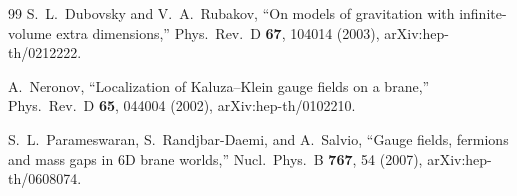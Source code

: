\documentclass[aps,prd,reprint,superscriptaddress,nofootinbib,floatfix]{revtex4-2}
\theoremstyle{definition}
\begin{document}
\begin{thebibliography}{99}
 S.~L.~Dubovsky and V.~A.~Rubakov, ``On models of gravitation with infinite-volume extra dimensions,'' Phys.\ Rev.\ D \textbf{67}, 104014 (2003), arXiv:hep-th/0212222.

 A.~Neronov, ``Localization of Kaluza--Klein gauge fields on a brane,'' Phys.\ Rev.\ D \textbf{65}, 044004 (2002), arXiv:hep-th/0102210.

 S.~L.~Parameswaran, S.~Randjbar-Daemi, and A.~Salvio, ``Gauge fields, fermions and mass gaps in 6D brane worlds,'' Nucl.\ Phys.\ B \textbf{767}, 54 (2007), arXiv:hep-th/0608074.

\end{thebibliography}
\end{document}

